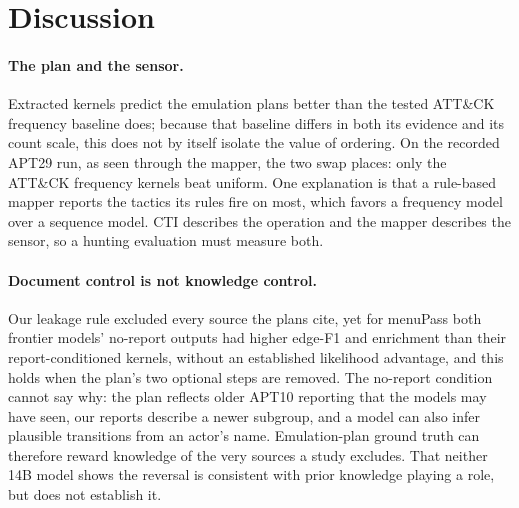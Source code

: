\documentclass[letterpaper]{article}
\newif\ifflags
\newcommand{\flag}[1]{\ifflags\textcolor{red}{\textsuperscript{\textbf{[#1]}}}\fi}
\begin{document}
\section{Discussion}

\paragraph{The plan and the sensor.} Extracted kernels predict the emulation plans better than the tested ATT\&CK frequency baseline does; because that baseline differs in both its evidence and its count scale, this does not by itself isolate the value of ordering. On the recorded APT29 run, as seen through the mapper, the two swap places: only the ATT\&CK frequency kernels beat uniform. One explanation is that a rule-based mapper reports the tactics its rules fire on most, which favors a frequency model over a sequence model. CTI describes the operation and the mapper describes the sensor, so a hunting evaluation must measure both.

\paragraph{Document control is not knowledge control.} Our leakage rule excluded every source the plans cite, yet for menuPass both frontier models' no-report outputs had higher edge-F1 and enrichment than their report-conditioned kernels, without an established likelihood advantage, and this holds when the plan's two optional steps are removed. The no-report condition cannot say why: the plan reflects older APT10 reporting that the models may have seen,\flag{F7} our reports describe a newer subgroup, and a model can also infer plausible transitions from an actor's name. Emulation-plan ground truth can therefore reward knowledge of the very sources a study excludes. That neither 14B model shows the reversal is consistent with prior knowledge playing a role, but does not establish it.
\end{document}

